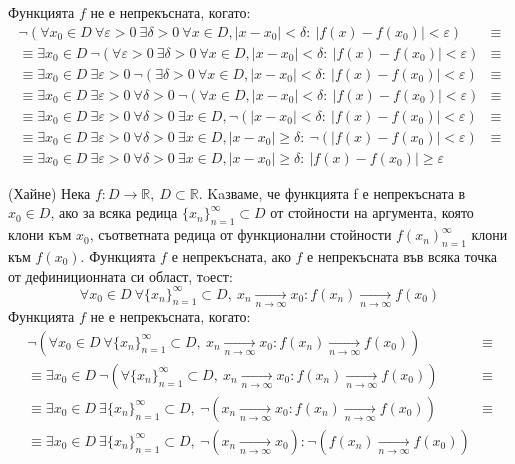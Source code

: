 \documentclass{article}
\newcommand*{\bR}{\mathbb{R}}
\begin{document}
Функцията $f$ не е непрекъсната, когато:
\begin{align*}
    \neg(\forall x_0 \in D \ \forall \varepsilon > 0 \ \exists \delta > 0 \  \forall x \in D, |x - x_0| < \delta : \ |f (x) - f (x_0)| < \varepsilon)          & \equiv \\
    \equiv\exists x_0 \in D \ \neg(\forall \varepsilon > 0 \ \exists \delta > 0 \  \forall x \in D, |x - x_0| < \delta : \ |f (x) - f (x_0)| < \varepsilon)    & \equiv \\
    \equiv\exists x_0 \in D \ \exists \varepsilon > 0 \ \neg(\exists \delta > 0 \  \forall x \in D, |x - x_0| < \delta : \ |f (x) - f (x_0)| < \varepsilon)    & \equiv \\
    \equiv\exists x_0 \in D \ \exists \varepsilon > 0 \ \forall \delta > 0 \  \neg(\forall x \in D, |x - x_0| < \delta : \ |f (x) - f (x_0)| < \varepsilon)    & \equiv \\
    \equiv\exists x_0 \in D \ \exists \varepsilon > 0 \ \forall \delta > 0 \  \exists x \in D,\neg( |x - x_0| < \delta : \ |f (x) - f (x_0)| < \varepsilon)    & \equiv \\
    \equiv\exists x_0 \in D \ \exists \varepsilon > 0 \ \forall \delta > 0 \  \exists x \in D, |x - x_0| \geq \delta : \ \neg(|f (x) - f (x_0)| < \varepsilon) & \equiv \\
    \equiv\exists x_0 \in D \ \exists \varepsilon > 0 \ \forall \delta > 0 \  \exists x \in D, |x - x_0| \geq \delta : \ |f (x) - f (x_0)| \geq \varepsilon    &
\end{align*}

(Хайне) Нека $f : D \rightarrow \bR, \ D \subset \bR$. Kaзваме, че
функцията f е непрекъсната в $x_0 \in D$, ако за всяка редица $\{x_n\}^\infty_{n=1} \subset D$ от стойности на аргумента,
която клони към $x_0$, съответната редица от функционални стойности ${f(x_n)}^\infty_{n=1}$ клони към $f(x_0)$. Функцията $f$
е непрекъсната, ако $f$ е непрекъсната във всяка точка от дефиниционната си област, тoест:
\[
    \forall x_0 \in D \ \forall \{x_n\}^\infty_{n=1} \subset D, \ x_n \xrightarrow[n\rightarrow\infty]{} x_0 : f (x_n) \xrightarrow[n\rightarrow\infty]{} f(x_0)
\]
Функцията $f$ не е непрекъсната, когато:
\begin{align*}
    \neg(\forall x_0 \in D \ \forall \{x_n\}^\infty_{n=1} \subset D, \ x_n \xrightarrow[n\rightarrow\infty]{} x_0 : f (x_n) \xrightarrow[n\rightarrow\infty]{} f(x_0))             & \equiv \\
    \equiv\exists x_0 \in D \ \neg(\forall \{x_n\}^\infty_{n=1} \subset D, \ x_n \xrightarrow[n\rightarrow\infty]{} x_0 : f (x_n) \xrightarrow[n\rightarrow\infty]{} f(x_0))       & \equiv \\
    \equiv\exists x_0 \in D \ \exists \{x_n\}^\infty_{n=1} \subset D, \ \neg(x_n \xrightarrow[n\rightarrow\infty]{} x_0 : f (x_n) \xrightarrow[n\rightarrow\infty]{} f(x_0))       & \equiv \\
    \equiv\exists x_0 \in D \ \exists \{x_n\}^\infty_{n=1} \subset D, \ \neg(x_n \xrightarrow[n\rightarrow\infty]{} x_0) : \neg(f (x_n) \xrightarrow[n\rightarrow\infty]{} f(x_0)) &
\end{align*}
\end{document}
